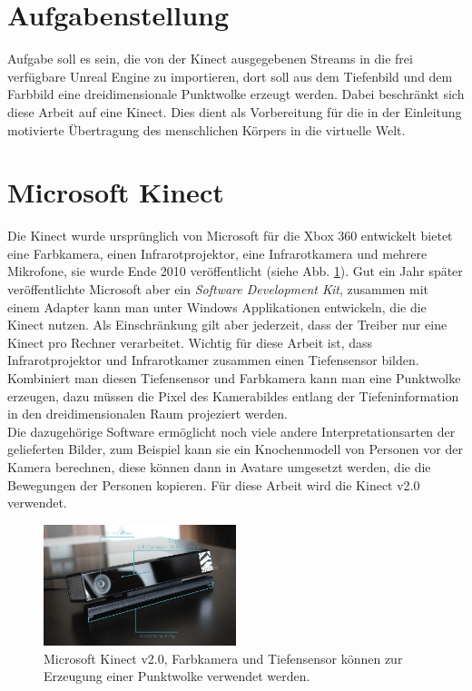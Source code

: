 \documentclass[a4paper]{IEEEtran}
\begin{document}
\section{Aufgabenstellung}
	Aufgabe soll es sein, die von der Kinect ausgegebenen Streams in die frei verfügbare Unreal Engine zu importieren, dort soll aus dem Tiefenbild und dem Farbbild eine dreidimensionale Punktwolke erzeugt werden. 
	Dabei beschränkt sich diese Arbeit auf eine Kinect. 
	Dies dient als Vorbereitung für die in der Einleitung motivierte Übertragung des menschlichen Körpers in die virtuelle Welt. \\


\section{Microsoft Kinect}
	Die Kinect wurde ursprünglich von Microsoft für die Xbox 360 entwickelt bietet eine Farbkamera, einen Infrarotprojektor, eine Infrarotkamera und mehrere Mikrofone, sie wurde Ende 2010 veröffentlicht (siehe Abb. \ref{Kinectv2}). 
	Gut ein Jahr später veröffentlichte Microsoft aber ein \textit{Software Development Kit}, zusammen mit einem Adapter kann man unter Windows Applikationen entwickeln, die die Kinect nutzen.
	Als Einschränkung gilt aber jederzeit, dass der Treiber nur eine Kinect pro Rechner verarbeitet.
	Wichtig für diese Arbeit ist, dass Infrarotprojektor und Infrarotkamer zusammen einen Tiefensensor bilden. 
	Kombiniert man diesen Tiefensensor und Farbkamera kann man eine Punktwolke erzeugen, dazu müssen die Pixel des Kamerabildes entlang der Tiefeninformation in den dreidimensionalen Raum projeziert werden. \\
	Die dazugehörige Software ermöglicht noch viele andere Interpretationsarten der gelieferten Bilder, zum Beispiel kann sie ein Knochenmodell von Personen vor der Kamera berechnen, diese können dann in Avatare umgesetzt werden, die die Bewegungen der Personen kopieren.
	Für diese Arbeit wird die Kinect v2.0 verwendet. \\[0.5cm]
	
	\begin{figure}[!h]
    	\centering
		\includegraphics[width=0.5\textwidth]{img/Kinectv2}
	    \caption{Microsoft Kinect v2.0, Farbkamera und Tiefensensor können zur Erzeugung einer Punktwolke verwendet werden.}
    	\label{Kinectv2}
	\end{figure}
	
\end{document}
